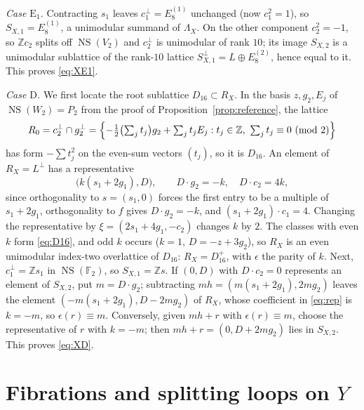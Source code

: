 \documentclass[12pt]{article}
\newcommand{\Z}{\mathbb Z}
\newcommand{\F}{\mathbb F}
\newcommand{\NS}{\operatorname{NS}}
\theoremstyle{definition}
\theoremstyle{remark}
\begin{document}
\emph{Case \(\mathrm E_1\).} Contracting \(s_1\) leaves
\(c_1^\perp=E_8^{(1)}\) unchanged (now \(c_1^2=1\)), so
\(S_{X,1}=E_8^{(1)}\), a unimodular summand of \(\Lambda_X\). On the
other component \(c_2^2=-1\), so \(\Z c_2\) splits off \(\NS(V_2)\) and
\(c_2^\perp\) is unimodular of rank \(10\); its image \(S_{X,2}\) is a
unimodular sublattice of the rank-\(10\) lattice
\(S_{X,1}^\perp=L\oplus E_8^{(2)}\), hence equal to it. This proves
\eqref{eq:XE1}.

\emph{Case \(\mathrm D\).} We first locate the root sublattice
\(D_{16}\subset R_X\). In the basis \(z,g_2,E_j\) of
\(\NS(W_2)=P_2\) from the proof of Proposition~\ref{prop:reference},
the lattice
\begin{equation}\label{eq:D16}
 R_0=c_2^\perp\cap g_2^\perp
 =\Bigl\{-\tfrac12\bigl(\textstyle\sum_jt_j\bigr)g_2+\sum_jt_jE_j:
                     t_j\in\Z,\ \sum_jt_j\equiv0\ (\mathrm{mod}\ 2)\Bigr\}
\end{equation}
has form \(-\sum t_j^2\) on the even-sum vectors \((t_j)\), so it is
\(D_{16}\). An element of \(R_X=L^\perp\) has a representative
\begin{equation}\label{eq:rep}
 \bigl(k(s_1+2g_1),D\bigr),\qquad
 D\cdot g_2=-k,\quad D\cdot c_2=4k ,
\end{equation}
since orthogonality to \(s=(s_1,0)\) forces the first entry to be a
multiple of \(s_1+2g_1\), orthogonality to \(f\) gives
\(D\cdot g_2=-k\), and \((s_1+2g_1)\cdot c_1=4\). Changing the
representative by \(\xi=(2s_1+4g_1,-c_2)\) changes \(k\) by \(2\). The
classes with even \(k\) form \eqref{eq:D16}, and odd \(k\) occurs
(\(k=1\), \(D=-z+3g_2\)), so \(R_X\) is an even unimodular index-two overlattice of \(D_{16}\):
\(R_X=D_{16}^+\), with \(\epsilon\) the parity of \(k\). Next,
\(c_1^\perp=\Z s_1\) in \(\NS(\F_2)\), so \(S_{X,1}=\Z s\). If
\((0,D)\) with \(D\cdot c_2=0\) represents an element of \(S_{X,2}\),
put \(m=D\cdot g_2\); subtracting \(mh=(m(s_1+2g_1),2mg_2)\) leaves the
element \((-m(s_1+2g_1),D-2mg_2)\) of \(R_X\), whose coefficient in
\eqref{eq:rep} is \(k=-m\), so \(\epsilon(r)\equiv m\). Conversely,
given \(mh+r\) with \(\epsilon(r)\equiv m\), choose the representative
of \(r\) with \(k=-m\); then \(mh+r=(0,D+2mg_2)\) lies in \(S_{X,2}\).
This proves \eqref{eq:XD}.

\section{Fibrations and splitting loops on \texorpdfstring{\(Y\)}{Y}}\label{sec:fibrations}
\end{document}

